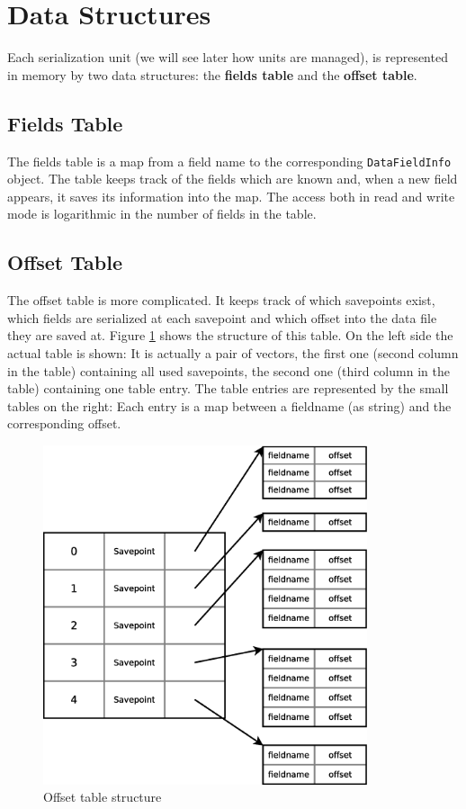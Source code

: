 \documentclass[a4paper,10pt]{article}
\begin{document}
\section{Data Structures}
\label{datastructures}

Each serialization unit (we will see later how units are managed), is 
represented in memory by two data structures: the \textbf{fields table} and the 
\textbf{offset table}.

\subsection{Fields Table}

The fields table is a map from a field name to the corresponding 
\texttt{DataFieldInfo} object. The table keeps track of the fields which are 
known and, when a new field appears, it saves its information into the map.
The access both in read and write mode is logarithmic in the number of fields 
in the table.

\subsection{Offset Table}

The offset table is more complicated. It keeps track of which savepoints exist, 
which fields are serialized at each savepoint and which offset into the data 
file they are saved at. Figure \ref{fig:offsettable} shows the structure 
of this table. On the left side the actual table is shown: It is actually a 
pair of vectors, the first one (second column in the table) containing all 
used savepoints, the second one (third column in the table) containing one 
table entry. The table entries are represented by the small tables on the 
right: Each entry is a map between a fieldname (as string) and the 
corresponding offset.

\begin{figure}[htb]
 \centering
 \includegraphics[width=0.85\textwidth]{./offsettable.eps}

 \caption{Offset table structure}
 \label{fig:offsettable}
\end{figure}
\end{document}
